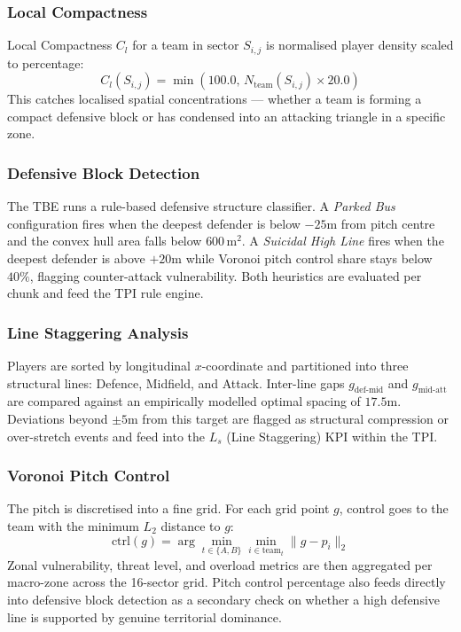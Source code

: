\documentclass[conference]{IEEEtran}
\begin{document}
\subsubsection{Local Compactness}

Local Compactness $C_l$ for a team in sector $S_{i,j}$ is normalised player density scaled to percentage:
\begin{equation}
    C_l(S_{i,j}) = \min\left(100.0,\, N_{\text{team}}(S_{i,j}) \times 20.0\right)
\end{equation}
This catches localised spatial concentrations --- whether a team is forming a compact defensive block or has condensed into an attacking triangle in a specific zone.

\subsubsection{Defensive Block Detection}

The TBE runs a rule-based defensive structure classifier. A \textit{Parked Bus} configuration fires when the deepest defender is below $-25\text{m}$ from pitch centre and the convex hull area falls below $600\,\text{m}^2$. A \textit{Suicidal High Line} fires when the deepest defender is above $+20\text{m}$ while Voronoi pitch control share stays below $40\%$, flagging counter-attack vulnerability. Both heuristics are evaluated per chunk and feed the TPI rule engine.

\subsubsection{Line Staggering Analysis}

Players are sorted by longitudinal $x$-coordinate and partitioned into three structural lines: Defence, Midfield, and Attack. Inter-line gaps $g_{\text{def-mid}}$ and $g_{\text{mid-att}}$ are compared against an empirically modelled optimal spacing of $17.5\text{m}$. Deviations beyond $\pm 5\text{m}$ from this target are flagged as structural compression or over-stretch events and feed into the $L_s$ (Line Staggering) KPI within the TPI.

\subsubsection{Voronoi Pitch Control}

The pitch is discretised into a fine grid. For each grid point $g$, control goes to the team with the minimum $L_2$ distance to $g$:
\begin{equation}
    \text{ctrl}(g) = \arg\min_{t \in \{A,B\}} \min_{i \in \text{team}_t} \|g - p_i\|_2
\end{equation}
Zonal vulnerability, threat level, and overload metrics are then aggregated per macro-zone across the 16-sector grid. Pitch control percentage also feeds directly into defensive block detection as a secondary check on whether a high defensive line is supported by genuine territorial dominance.
\end{document}
